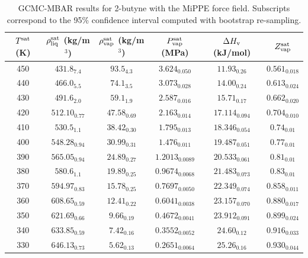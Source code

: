\documentclass[journal=jctc,manuscript=article]{achemso}
\begin{document}
\begin{table}[htb!]
	\caption{GCMC-MBAR results for 2-butyne with the MiPPE force field. Subscripts correspond to the 95\% confidence interval computed with bootstrap re-sampling.}
	\begin{center}
		\begin{tabular}{|c|c|c|c|c|c|}
			\hline
			$T^{\rm sat}$ (K) & $\rho_{\rm liq}^{\rm sat}$ (kg/m$^3$) & $\rho_{\rm vap}^{\rm sat}$ (kg/m$^3$) & $P_{\rm vap}^{\rm sat}$ (MPa) & $\Delta H_{\rm v}$ (kJ/mol) & $Z_{\rm vap}^{\rm sat}$ \\ \hline
			450 & $431.8_{7.4}$ & $93.5_{4.3}$ & $3.624_{0.050}$ & $11.93_{0.26}$ & $0.561_{0.018}$ \\
			440 & $466.0_{5.5}$ & $74.1_{3.5}$ & $3.073_{0.028}$ & $14.00_{0.24}$ & $0.613_{0.024}$ \\
			430 & $491.6_{2.0}$ & $59.1_{1.9}$ & $2.587_{0.016}$ & $15.71_{0.17}$ & $0.662_{0.020}$ \\
			420 & $512.10_{0.77}$ & $47.58_{0.69}$ & $2.163_{0.014}$ & $17.114_{0.094}$ & $0.704_{0.010}$ \\
			410 & $530.5_{1.1}$ & $38.42_{0.30}$ & $1.795_{0.013}$ & $18.346_{0.054}$ & $0.74_{0.01}$ \\
			400 & $548.28_{0.94}$ & $30.99_{0.31}$ & $1.476_{0.011}$ & $19.487_{0.051}$ & $0.77_{0.01}$ \\
			390 & $565.05_{0.94}$ & $24.89_{0.27}$ & $1.2013_{0.0089}$ & $20.533_{0.061}$ & $0.81_{0.01}$ \\
			380 & $580.6_{1.1}$ & $19.89_{0.25}$ & $0.9674_{0.0068}$ & $21.483_{0.073}$ & $0.83_{0.01}$ \\
			370 & $594.97_{0.83}$ & $15.78_{0.25}$ & $0.7697_{0.0050}$ & $22.349_{0.074}$ & $0.858_{0.011}$ \\
			360 & $608.65_{0.59}$ & $12.41_{0.22}$ & $0.6041_{0.0038}$ & $23.157_{0.070}$ & $0.880_{0.017}$ \\
			350 & $621.69_{0.66}$ & $9.66_{0.19}$ & $0.4672_{0.0041}$ & $23.912_{0.091}$ & $0.899_{0.024}$ \\
			340 & $633.85_{0.59}$ & $7.42_{0.16}$ & $0.3552_{0.0052}$ & $24.60_{0.12}$ & $0.916_{0.033}$ \\
			330 & $646.13_{0.73}$ & $5.62_{0.13}$ & $0.2651_{0.0064}$ & $25.26_{0.16}$ & $0.930_{0.044}$ \\
			\hline
		\end{tabular}
	\end{center}
\end{table}
\end{document}
